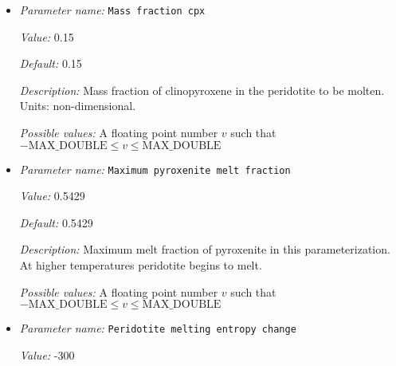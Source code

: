 \begin{itemize}
{\it Default:} -611.4


{\it Description:} Prefactor of the quadratic depletion term in the quadratic function that approximates the melt fraction of pyroxenite. Units: $°C/(Pa^2)$.


{\it Possible values:} A floating point number $v$ such that $-\text{MAX\_DOUBLE} \leq v \leq \text{MAX\_DOUBLE}$
\item {\it Parameter name:} {\tt Mass fraction cpx}
\label{parameters:Material model/Latent heat melt/Mass fraction cpx}
\label{parameters:Material_20model/Latent_20heat_20melt/Mass_20fraction_20cpx}


{\it Value:} 0.15


{\it Default:} 0.15


{\it Description:} Mass fraction of clinopyroxene in the peridotite to be molten. Units: non-dimensional.


{\it Possible values:} A floating point number $v$ such that $-\text{MAX\_DOUBLE} \leq v \leq \text{MAX\_DOUBLE}$
\item {\it Parameter name:} {\tt Maximum pyroxenite melt fraction}
\label{parameters:Material model/Latent heat melt/Maximum pyroxenite melt fraction}
\label{parameters:Material_20model/Latent_20heat_20melt/Maximum_20pyroxenite_20melt_20fraction}


{\it Value:} 0.5429


{\it Default:} 0.5429


{\it Description:} Maximum melt fraction of pyroxenite in this parameterization. At higher temperatures peridotite begins to melt.


{\it Possible values:} A floating point number $v$ such that $-\text{MAX\_DOUBLE} \leq v \leq \text{MAX\_DOUBLE}$
\item {\it Parameter name:} {\tt Peridotite melting entropy change}
\label{parameters:Material model/Latent heat melt/Peridotite melting entropy change}
\label{parameters:Material_20model/Latent_20heat_20melt/Peridotite_20melting_20entropy_20change}


{\it Value:} -300



\end{itemize}
